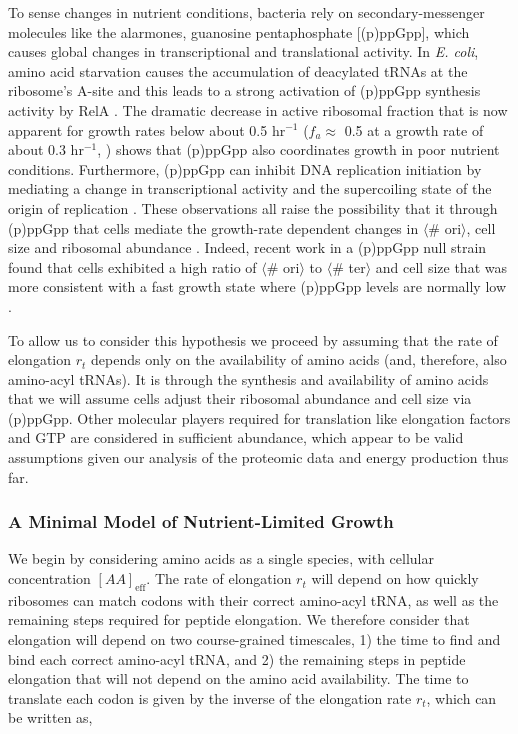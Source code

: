 To sense changes in nutrient conditions, bacteria rely on secondary-messenger
molecules like the alarmones, guanosine pentaphosphate [(p)ppGpp], which causes
global changes in transcriptional and translational activity.  In \textit{E.
coli}, amino acid starvation causes the accumulation of deacylated tRNAs at the
ribosome's A-site and this leads to a strong activation of (p)ppGpp synthesis
activity by RelA \citep{hauryliuk2015}.  The dramatic decrease in active
ribosomal fraction that is now apparent for growth rates below about 0.5
hr$^{-1}$ ($f_a \approx$ 0.5 at a growth rate of about 0.3 hr$^{-1}$,
\cite{dai2016}) shows that (p)ppGpp also coordinates growth in poor nutrient
conditions. Furthermore, (p)ppGpp can inhibit DNA replication initiation by
mediating a change in transcriptional activity and the supercoiling state of the
origin of replication \citep{kraemer2019}. These observations all raise the
possibility that it through (p)ppGpp that cells mediate the growth-rate dependent
changes in $\langle$\# ori$\rangle$, cell size and
ribosomal abundance \citep{zhu2019, Buke2020}. Indeed, recent work in a (p)ppGpp null
strain found that cells exhibited a high ratio of $\langle$\# ori$\rangle$ to
$\langle$\# ter$\rangle$ and cell size that was more consistent with a fast
growth state where (p)ppGpp levels are normally low \citep{fernandezcoll2020}.

To allow us to consider this hypothesis we proceed by assuming that the rate of
elongation $r_t$ depends only on the availability of amino acids (and,
therefore, also amino-acyl tRNAs). It is through the synthesis and availability
of amino acids that we will assume cells adjust their ribosomal abundance and
cell size via (p)ppGpp. Other molecular players required for translation like
elongation factors and GTP are considered in sufficient abundance, which appear
to be valid assumptions given our analysis of the proteomic data and energy
production thus far.


\subsubsection{A Minimal Model of Nutrient-Limited Growth}

We begin by considering amino acids as a single species, with cellular
concentration $[AA]_{\text{eff}}$. The rate of elongation $r_t$ will depend on
how quickly ribosomes can match codons with their correct amino-acyl tRNA, as
well as the remaining steps required for peptide elongation. We therefore
consider that elongation will depend on two course-grained timescales, 1) the
time to find and bind each correct amino-acyl tRNA, and 2) the remaining steps
in peptide elongation that will not depend on the amino acid availability. The
time to translate each codon is given by the inverse of the elongation rate
$r_t$, which can be written as,

